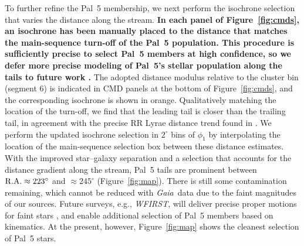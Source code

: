 \documentclass[twocolumn]{aastex62}
\newcommand{\gaia}{\textsl{Gaia}}
\newcommand{\changes}[1]{{\textbf{#1}}}
\begin{document}
To further refine the Pal~5 membership, we next perform the isochrone selection that varies the distance along the stream.
\changes{In each panel of Figure~\ref{fig:cmds}, an isochrone has been manually placed to the distance that matches the main-sequence turn-off of the Pal~5 population.
This procedure is sufficiently precise to select Pal~5 members at high confidence, so we defer more precise modeling of Pal~5's stellar population along the tails to future work \citep[e.g., by using isochrone-fitting methods implemented in][]{brutus}.
}
The adopted distance modulus relative to the cluster bin (segment 6) is indicated in CMD panels at the bottom of Figure~\ref{fig:cmds}, and the corresponding isochrone is shown in orange.
Qualitatively matching the location of the turn-off, we find that the leading tail is closer than the trailing tail, in agreement with the precise RR Lyrae distance trend found in \citet{Price-Whelan:2019}.
We perform the updated isochrone selection in $2^\circ$ bins of $\phi_1$ by interpolating the location of the main-sequence selection box between these distance estimates.
With the improved star--galaxy separation and a selection that accounts for the distance gradient along the stream, Pal~5 tails are prominent between $\rm R.A.\approx223^\circ$ and $\approx245^\circ$ (Figure~\ref{fig:map}).
There is still some contamination remaining, which cannot be reduced with \gaia\ data due to the faint magnitudes of our sources.
Future surveys, e.g., \textsl{WFIRST}, will deliver precise proper motions for faint stars \citep{Sanderson:2017}, and enable additional selection of Pal~5 members based on kinematics.
At the present, however, Figure~\ref{fig:map} shows the cleanest selection of Pal~5 stars.
\end{document}
